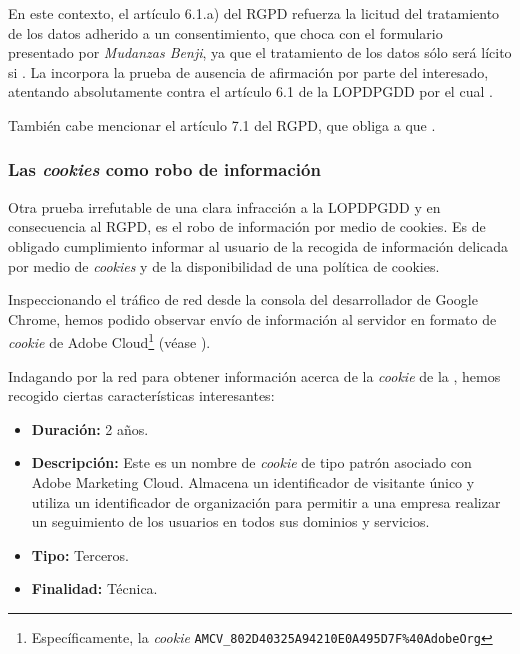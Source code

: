 En este contexto, el artículo 6.1.a) del RGPD refuerza la licitud del tratamiento de los datos adherido a un consentimiento, que choca con el formulario presentado por \textit{Mudanzas Benji}, ya que el tratamiento de los datos sólo será lícito si . La  incorpora la prueba de ausencia de afirmación por parte del interesado, atentando absolutamente contra el artículo 6.1 de la LOPDPGDD por el cual .


También cabe mencionar el artículo 7.1 del RGPD, que obliga a que .



\subsubsection{Las \textit{cookies} como robo de información}
Otra prueba irrefutable de una clara infracción a la LOPDPGDD y en consecuencia al RGPD, es el robo de información por medio de cookies. Es de obligado cumplimiento informar al usuario de la recogida de información delicada por medio de \textit{cookies} y de la disponibilidad de una política de cookies.

Inspeccionando el tráfico de red desde la consola del desarrollador de Google Chrome, hemos podido observar envío de información al servidor en formato de \textit{cookie} de Adobe Cloud\footnote{Específicamente, la \textit{cookie} \texttt{AMCV\_802D40325A94210E0A495D7F\%40AdobeOrg}} (véase ).


Indagando por la red para obtener información acerca de la \textit{cookie} de la , hemos recogido ciertas características interesantes:
\newpage
\begin{itemize}
    \item \textbf{Duración:} 2 años.
    \item \textbf{Descripción:} Este es un nombre de \textit{cookie} de tipo patrón asociado con Adobe Marketing Cloud. Almacena un identificador de visitante único y utiliza un identificador de organización para permitir a una empresa realizar un seguimiento de los usuarios en todos sus dominios y servicios.
    \item \textbf{Tipo:} Terceros.
    \item \textbf{Finalidad:} Técnica.
\end{itemize}

